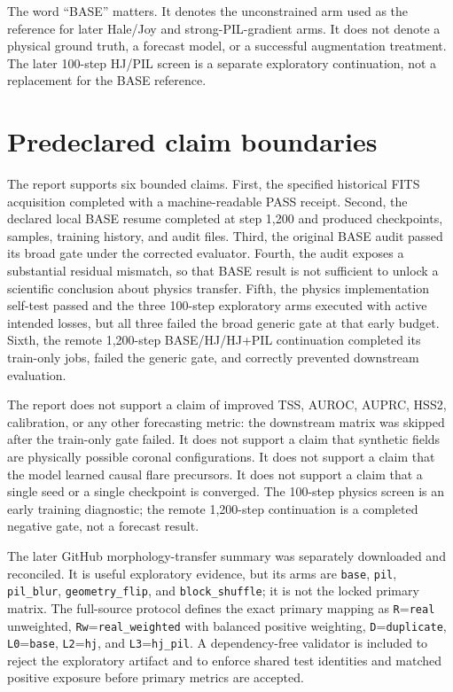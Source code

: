 \documentclass[11pt,oneside]{report}
\begin{document}
The word ``BASE'' matters. It denotes the unconstrained arm used as the reference for later Hale/Joy and strong-PIL-gradient arms. It does not denote a physical ground truth, a forecast model, or a successful augmentation treatment. The later 100-step HJ/PIL screen is a separate exploratory continuation, not a replacement for the BASE reference.

\section{Predeclared claim boundaries}

The report supports six bounded claims. First, the specified historical FITS acquisition completed with a machine-readable PASS receipt. Second, the declared local BASE resume completed at step 1,200 and produced checkpoints, samples, training history, and audit files. Third, the original BASE audit passed its broad gate under the corrected evaluator. Fourth, the audit exposes a substantial residual mismatch, so that BASE result is not sufficient to unlock a scientific conclusion about physics transfer. Fifth, the physics implementation self-test passed and the three 100-step exploratory arms executed with active intended losses, but all three failed the broad generic gate at that early budget. Sixth, the remote 1,200-step BASE/HJ/HJ+PIL continuation completed its train-only jobs, failed the generic gate, and correctly prevented downstream evaluation.

The report does not support a claim of improved TSS, AUROC, AUPRC, HSS2, calibration, or any other forecasting metric: the downstream matrix was skipped after the train-only gate failed. It does not support a claim that synthetic fields are physically possible coronal configurations. It does not support a claim that the model learned causal flare precursors. It does not support a claim that a single seed or a single checkpoint is converged. The 100-step physics screen is an early training diagnostic; the remote 1,200-step continuation is a completed negative gate, not a forecast result.

The later GitHub morphology-transfer summary was separately downloaded and reconciled. It is useful exploratory evidence, but its arms are \texttt{base}, \texttt{pil}, \texttt{pil\_blur}, \texttt{geometry\_flip}, and \texttt{block\_shuffle}; it is not the locked primary matrix. The full-source protocol defines the exact primary mapping as \texttt{R}=\texttt{real} unweighted, \texttt{Rw}=\texttt{real\_weighted} with balanced positive weighting, \texttt{D}=\texttt{duplicate}, \texttt{L0}=\texttt{base}, \texttt{L2}=\texttt{hj}, and \texttt{L3}=\texttt{hj\_pil}. A dependency-free validator is included to reject the exploratory artifact and to enforce shared test identities and matched positive exposure before primary metrics are accepted.
\end{document}

